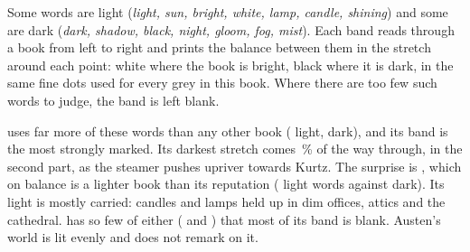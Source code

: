 \noindent Some words are light (\emph{light, sun, bright, white, lamp, candle,
shining}) and some are dark (\emph{dark, shadow, black, night, gloom, fog,
mist}). Each band reads through a book from left to right and prints the balance
between them in the stretch around each point: white where the book is bright,
black where it is dark, in the same fine dots used for every grey in this book.
Where there are too few such words to judge, the band is left blank.

 uses far more of these words than any other book
( light,  dark),
and its band is the most strongly marked. Its darkest stretch comes
\,\% of the way through, in the second
part, as the steamer pushes upriver towards Kurtz. The surprise is
, which on balance is a lighter book than its reputation
( light words against  dark).
Its light is mostly carried: candles and lamps held up in dim offices, attics
and the cathedral.  has so few of either
( and ) that
most of its band is blank. Austen's world is lit evenly and does not remark
on it.
